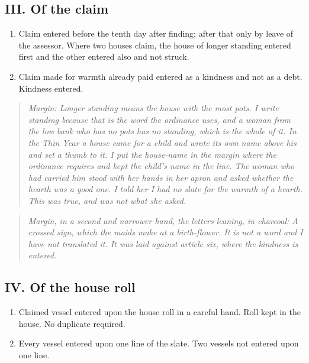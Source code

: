 \documentclass{design/chronicle}
\begin{document}
\subsection*{III. Of the claim}

\begin{enumerate}[leftmargin=1.4em,itemsep=1pt,topsep=3pt,parsep=0pt]

\item Claim entered before the tenth day after finding; after that only by leave of the assessor. Where two houses claim, the house of longer standing entered first and the other entered also and not struck.

\item Claim made for warmth already paid entered as a kindness and not as a debt. Kindness entered.

\end{enumerate}

\begin{quote}\itshape \emph{Margin:} Longer standing means the house with the most pots. I write \emph{standing} because that is the word the ordinance uses, and a woman from the low bank who has no pots has no standing, which is the whole of it. In the Thin Year a house came for a child and wrote its own name above his and set a thumb to it. I put the house-name in the margin where the ordinance requires and kept the child’s name in the line. The woman who had carried him stood with her hands in her apron and asked whether the hearth was a good one. I told her I had no slate for the warmth of a hearth. This was true, and was not what she asked.\end{quote}

\begin{quote}\itshape \emph{Margin, in a second and narrower hand, the letters leaning, in charcoal:} A crossed sign, which the maids make at a birth-flower. It is not a word and I have not translated it. It was laid against article six, where the kindness is entered.\end{quote}

\subsection*{IV. Of the house roll}

\begin{enumerate}[leftmargin=1.4em,itemsep=1pt,topsep=3pt,parsep=0pt]

\item Claimed vessel entered upon the house roll in a careful hand. Roll kept in the house. No duplicate required.

\item Every vessel entered upon one line of the slate. Two vessels not entered upon one line.

\end{enumerate}
\end{document}
